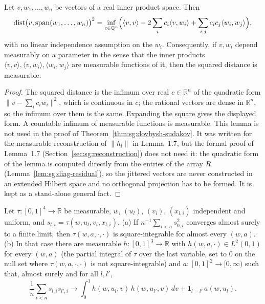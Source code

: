 \begin{lemma}\label{lem:sg:proj-distance}
  \leanok
Let $v,w_1,\dots,w_n$ be vectors of a real inner product space. Then
\[
\operatorname{dist}\bigl(v,\operatorname{span}(w_1,\dots,w_n)\bigr)^2=\inf_{c\in\mathbb Q^n}\Bigl(\langle v,v\rangle-2\sum_i c_i\langle v,w_i\rangle+\sum_{i,j}c_ic_j\langle w_i,w_j\rangle\Bigr),
\]
with no linear independence assumption on the $w_i$. Consequently, if $v,w_i$ depend measurably on a parameter in the sense that the inner products $\langle v,v\rangle,\langle v,w_i\rangle,\langle w_i,w_j\rangle$ are measurable functions of it, then the squared distance is measurable.
\end{lemma}

\begin{proof}
  \leanok
The squared distance is the infimum over real $c\in\mathbb R^n$ of the quadratic form $\|v-\sum_ic_iw_i\|^2$, which is continuous in $c$; the rational vectors are dense in $\mathbb R^n$, so the infimum over them is the same. Expanding the square gives the displayed form. A countable infimum of measurable functions is measurable. This lemma is not used in the proof of Theorem~\ref{thm:sg:dovbysh-sudakov}. It was written for the measurable reconstruction of $\|h_l\|$ in Lemma~1.7, but the formal proof of Lemma~1.7 (Section~\ref{sec:sg:reconstruction}) does not need it: the quadratic form of the lemma is computed directly from the entries of the array $R$ (Lemma~\ref{lem:sg:diag-residual}), so the jittered vectors are never constructed in an extended Hilbert space and no orthogonal projection has to be formed. It is kept as a stand-alone general fact.
\end{proof}

\begin{theorem}\label{thm:sg:ah-empirical}
  \leanok
Let $\tau:[0,1]^4\to\mathbb R$ be measurable, $w$, $(u_l)$, $(v_i)$, $(x_{l,i})$ independent and uniform, and $s_{l,i}=\tau(w,u_l,v_i,x_{l,i})$.
(a) If $n^{-1}\sum_{i<n}s_{0,i}^2$ converges almost surely to a finite limit, then $\tau(w,a,\cdot,\cdot)$ is square-integrable for almost every $(w,a)$.
(b) In that case there are measurable $h:[0,1]^3\to\mathbb R$ with $h(w,a,\cdot)\in L^2(0,1)$ for every $(w,a)$ (the partial integral of $\tau$ over the last variable, set to $0$ on the null set where $\tau(w,a,\cdot,\cdot)$ is not square-integrable) and $a:[0,1]^2\to[0,\infty)$ such that, almost surely and for all $l,l'$,
\[\frac1n\sum_{i<n}s_{l,i}s_{l',i}\longrightarrow\int_0^1h(w,u_l,v)\,h(w,u_{l'},v)\,dv+\mathbf 1_{l=l'}\,a(w,u_l).\]
\end{theorem}

